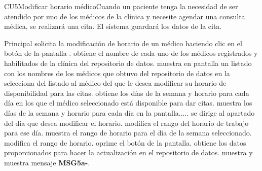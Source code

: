\begin{UseCase}{CU5}{Modificar horario médico}{Cuando un paciente tenga la necesidad de ser atendido por uno de los médicos de la clínica y necesite agendar una consulta médica, se realizará una cita. El sistema guardará los datos de la cita.}
{\begin{itemize}
    \end{itemize}
  }
\end{UseCase}

\begin{UCtrayectoria}{Principal}  
  \UCpaso[\UCactor] solicita la modificación de horario de un médico haciendo clic en el botón  de la pantalla .
  \UCpaso obtiene el nombre de cada uno de los médicos registrados y habilitados de la clínica del repositorio de datos.
  \UCpaso muestra en pantalla un listado con los nombres de los médicos que obtuvo del repositorio de datos en la 
  \UCpaso[\UCactor] selecciona del listado al médico del que le desea modificar su horario de disponibilidad para las citas.
  \UCpaso obtiene los días de la semana y horario para cada día en los que el médico seleccionado está disponible para dar citas.
  \UCpaso muestra los días de la semana y horario para cada día en la pantalla.....  
  \UCpaso[\UCactor] se dirige al apartado del día que desea modificar el horario.
  \UCpaso[\UCactor] modifica el rango del horario de trabajo para ese día.
  \UCpaso muestra el rango de horario para el día de la semana seleccionado.
  \UCpaso[\UCactor] modifica el rango de horario.
  \UCpaso[\UCactor] oprime el botón  de la pantalla.
  \UCpaso obtiene los datos proporcionados para hacer la actualización en el repositorio de datos.
  \UCpaso muestra  y muestra mensaje {\bf MSG5a-}.     
\end{UCtrayectoria}

